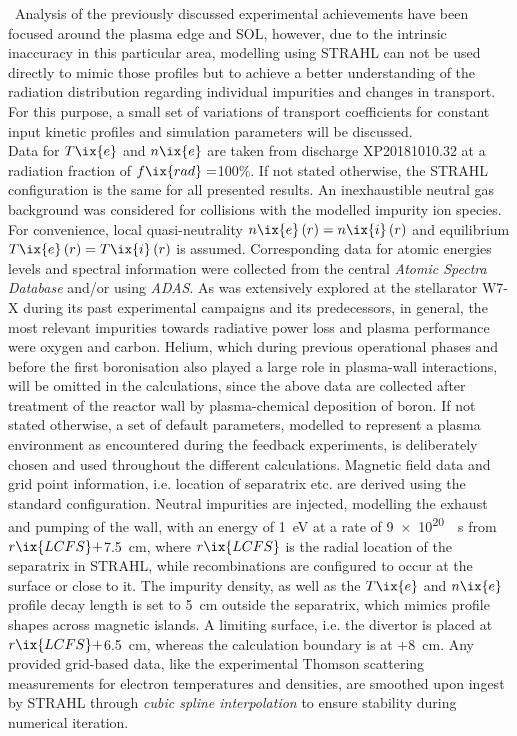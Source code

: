 %
            \,\newline%
            Analysis of the previously discussed experimental achievements have been focused around the plasma edge and SOL, however, due to the intrinsic inaccuracy in this particular area, modelling using STRAHL can not be used directly to mimic those profiles but to achieve a better understanding of the radiation distribution regarding individual impurities and changes in transport. For this purpose, a small set of variations of transport coefficients for constant input kinetic profiles and simulation parameters will be discussed.\\%
            Data for $T\ix{e}$ and $n\ix{e}$ are taken from discharge XP20181010.32 at a radiation fraction of $f\ix{rad}=$100\%. If not stated otherwise, the STRAHL configuration is the same for all presented results. An inexhaustible neutral gas background was considered for collisions with the modelled impurity ion species. For convenience, local quasi-neutrality $n\ix{e}\left(r\right)=n\ix{i}\left(r\right)$ and equilibrium $T\ix{e}\left(r\right)=T\ix{i}\left(r\right)$ is assumed. Corresponding data for atomic energies levels and spectral information were collected from the central \textit{Atomic Spectra Database}\cite{AtomicSpectra} and/or using \textit{ADAS}\cite{ADAS}. As was extensively explored at the stellarator W7-X during its past experimental campaigns and its predecessors\cite{Hirsch2008}, in general, the most relevant impurities towards radiative power loss and plasma performance were oxygen and carbon\cite{Wang2020,Sereda2020,Klinger2016}. Helium, which during previous operational phases and before the first boronisation also played a large role in plasma-wall interactions, will be omitted in the calculations, since the above data are collected after treatment of the reactor wall by plasma-chemical deposition of boron. If not stated otherwise, a set of default parameters, modelled to represent a plasma environment as encountered during the feedback experiments, is deliberately chosen and used throughout the different calculations. Magnetic field data and grid point information, i.e. location of separatrix etc. are derived using the standard configuration. Neutral impurities are injected, modelling the exhaust and pumping of the wall, with an energy of \SI{1}{\electronvolt} at a rate of \SI{9e20}{\per\second} from $r\ix{LCFS}+$\SI{7.5}{\centi\meter}, where $r\ix{LCFS}$ is the radial location of the separatrix in STRAHL, while recombinations are configured to occur at the surface or close to it. The impurity density, as well as the $T\ix{e}$ and $n\ix{e}$ profile decay length is set to \SI{5}{\centi\meter} outside the separatrix, which mimics profile shapes across magnetic islands. A limiting surface, i.e. the divertor is placed at $r\ix{LCFS}+$\SI{6.5}{\centi\meter}, whereas the calculation boundary is at $+$\SI{8}{\centi\meter}. Any provided grid-based data, like the experimental Thomson scattering measurements for electron temperatures and densities, are smoothed upon ingest by STRAHL through \textit{cubic spline interpolation} to ensure stability during numerical iteration.%
